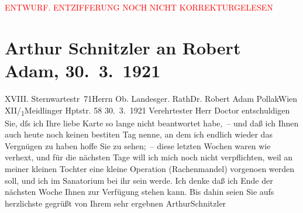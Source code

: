 
\begin{center}
            \textcolor{red}{ENTWURF. ENTZIFFERUNG NOCH NICHT KORREKTURGELESEN}
                      \end{center}
            
               \section[Arthur Schnitzler an Robert Adam, 30. 3. 1921]{ Arthur Schnitzler an Robert Adam, 30. 3. 1921}\nopagebreak{}\rehead{ }\begin{ledgroupsized}[t]{13cm}\normalsize\beginnumbering{} \toendnotes[C]{\smallbreak\pagebreak[2]} 
\toendnotes[C]{\smallbreak}\pstart{}{\pb}XVIII. Sternwartestr 71\pend{}{\bigskip}\pstart{}Herrn Ob. Landesger. Rath\pend{}\pstart{}Dr. Robert Adam Pollak\pend{}\pstart{}Wien XII/\textsubscript{1}\pend{}\pstart{}Meidlinger Hptstr. 58\pend{}{\bigskip}\pstart
           \raggedleft{}{\pb}30. 3. 1921\pend
           \pstart{}Verehrtester Herr Doctor\pend\pstart
           entschuldigen Sie, dſs ich Ihre liebe Karte so lange nicht beantwortet habe, –
                    und daß ich Ihnen auch heute noch keinen besti{\geminationm}ten
                    Tag nenne, an dem ich endlich wieder das Vergnügen zu haben hoffe Sie zu
                    sehen; – diese letzten Wochen waren wie verhext, und für die nächsten Tage will
                    ich mich noch nicht verpflichten, weil an meiner kleinen Tochter eine kleine Operation
                    (Rachenmandel) vorgeno{\geminationm}en werden soll, und ich im
                        Sanatorium bei ihr sein
                    {\pb}werde. Ich denke daß ich Ende der \introOben{}nächsten\introOben{} Woche Ihnen zur Verfügung stehen kann. Bis dahin seien Sie
                    aufs herzlichste gegrüßt von Ihrem sehr ergebnen\pend
           \pstart \spacefill\mbox{ArthurSchnitzler}\pend{}\endnumbering{}\end{ledgroupsized}  \newcommand{\dateiname}{L02365}\newcommand{\titel}{Arthur Schnitzler an Robert Adam, 30. 3. 1921}\newcommand{\editorInnen}{Martin Anton Müller und Gerd-Hermann Susen}
      